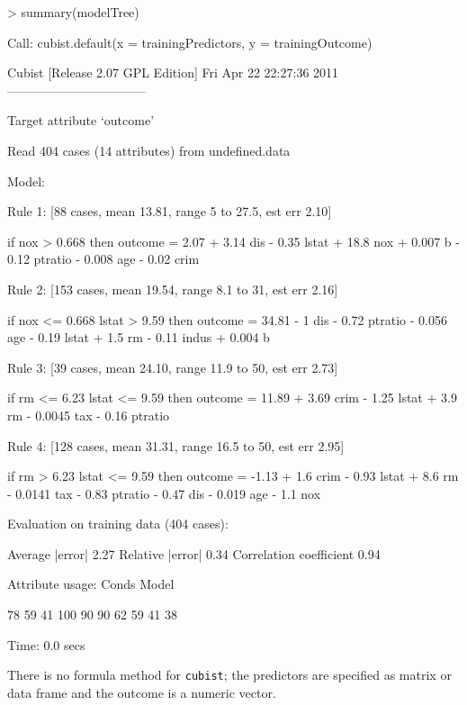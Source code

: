 \documentclass[12pt]{article}
\newcommand{\code}[1]{\mbox{\footnotesize\color{darkblue}\texttt{#1}}}
\renewenvironment{Schunk}{\vspace{\topsep}}{\vspace{\topsep}}
\begin{document}
\begin{Schunk}
\begin{Sinput}
> summary(modelTree)
\end{Sinput}
\begin{Soutput}
Call:
cubist.default(x = trainingPredictors, y = trainingOutcome)


Cubist [Release 2.07 GPL Edition]  Fri Apr 22 22:27:36 2011
---------------------------------

    Target attribute `outcome'

Read 404 cases (14 attributes) from undefined.data

Model:

  Rule 1: [88 cases, mean 13.81, range 5 to 27.5, est err 2.10]

    if
	nox > 0.668
    then
	outcome = 2.07 + 3.14 dis - 0.35 lstat + 18.8 nox + 0.007 b
	          - 0.12 ptratio - 0.008 age - 0.02 crim

  Rule 2: [153 cases, mean 19.54, range 8.1 to 31, est err 2.16]

    if
	nox <= 0.668
	lstat > 9.59
    then
	outcome = 34.81 - 1 dis - 0.72 ptratio - 0.056 age - 0.19 lstat + 1.5 rm
	          - 0.11 indus + 0.004 b

  Rule 3: [39 cases, mean 24.10, range 11.9 to 50, est err 2.73]

    if
	rm <= 6.23
	lstat <= 9.59
    then
	outcome = 11.89 + 3.69 crim - 1.25 lstat + 3.9 rm - 0.0045 tax
	          - 0.16 ptratio

  Rule 4: [128 cases, mean 31.31, range 16.5 to 50, est err 2.95]

    if
	rm > 6.23
	lstat <= 9.59
    then
	outcome = -1.13 + 1.6 crim - 0.93 lstat + 8.6 rm - 0.0141 tax
	          - 0.83 ptratio - 0.47 dis - 0.019 age - 1.1 nox


Evaluation on training data (404 cases):

    Average  |error|               2.27
    Relative |error|               0.34
    Correlation coefficient        0.94


	Attribute usage:
	  Conds  Model

	   78%   100%    lstat
	   59%    53%    nox
	   41%    78%    rm
	         100%    ptratio
	          90%    age
	          90%    dis
	          62%    crim
	          59%    b
	          41%    tax
	          38%    indus


Time: 0.0 secs
\end{Soutput}
\end{Schunk}
There is no formula method for \code{cubist}; the predictors are specified as matrix or data frame and the outcome is a numeric vector.
\end{document}
